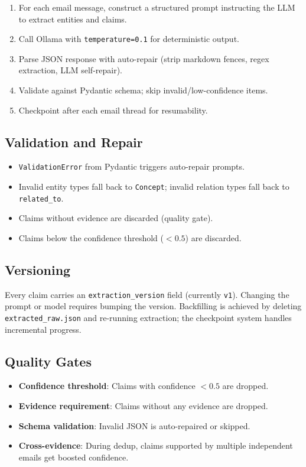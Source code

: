 \documentclass[11pt,a4paper]{article}
\begin{document}
\begin{enumerate}[nosep]
    \item For each email message, construct a structured prompt instructing the LLM to extract entities and claims.
    \item Call Ollama with \texttt{temperature=0.1} for deterministic output.
    \item Parse JSON response with auto-repair (strip markdown fences, regex extraction, LLM self-repair).
    \item Validate against Pydantic schema; skip invalid/low-confidence items.
    \item Checkpoint after each email thread for resumability.
\end{enumerate}

\subsection{Validation and Repair}
\begin{itemize}[nosep]
    \item \texttt{ValidationError} from Pydantic triggers auto-repair prompts.
    \item Invalid entity types fall back to \texttt{Concept}; invalid relation types fall back to \texttt{related\_to}.
    \item Claims without evidence are discarded (quality gate).
    \item Claims below the confidence threshold ($< 0.5$) are discarded.
\end{itemize}

\subsection{Versioning}
Every claim carries an \texttt{extraction\_version} field (currently \texttt{v1}). Changing the prompt or model requires bumping the version. Backfilling is achieved by deleting \texttt{extracted\_raw.json} and re-running extraction; the checkpoint system handles incremental progress.

\subsection{Quality Gates}
\begin{itemize}[nosep]
    \item \textbf{Confidence threshold}: Claims with confidence $< 0.5$ are dropped.
    \item \textbf{Evidence requirement}: Claims without any evidence are dropped.
    \item \textbf{Schema validation}: Invalid JSON is auto-repaired or skipped.
    \item \textbf{Cross-evidence}: During dedup, claims supported by multiple independent emails get boosted confidence.
\end{itemize}
\end{document}
